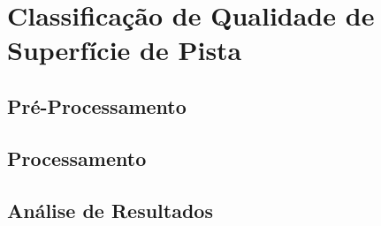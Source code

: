 \chapter{Classificação de Qualidade de Superfície de Pista}
\label{cap:classificacao_qualidade}

\section{Pré-Processamento}
\section{Processamento}
\section{Análise de Resultados}
